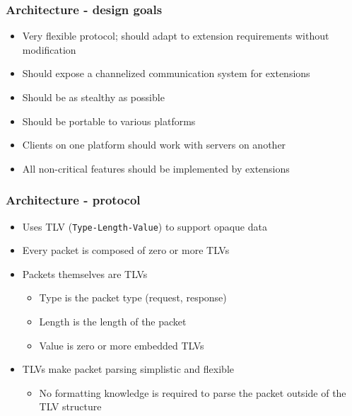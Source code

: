 \documentclass{beamer}
\newenvironment{sitemize}{\vspace{1mm}\begin{itemize}\itemsep 4pt\small}{\end{itemize}}
\begin{document}
\begin{frame}[t]
    \frametitle{Architecture - design goals}

    \begin{sitemize}
        \item Very flexible protocol; should adapt to extension
        requirements without modification

        \pause
        \item Should expose a channelized communication system for
        extensions

        \pause
        \item Should be as stealthy as possible

        \pause
        \item Should be portable to various platforms

        \pause
        \item Clients on one platform should work with servers on
        another

        \pause
        \item All non-critical features should be implemented by
        extensions
    \end{sitemize}
\end{frame}

\begin{frame}[t]
    \frametitle{Architecture - protocol}

    \begin{sitemize}
        \item Uses TLV (\texttt{Type-Length-Value}) to support
        opaque data

        \pause
        \item Every packet is composed of zero or more TLVs

        \pause
        \item Packets themselves are TLVs
        \begin{sitemize}
            \item Type is the packet type (request, response)
            \item Length is the length of the packet
            \item Value is zero or more embedded TLVs
        \end{sitemize}

        \pause
        \item TLVs make packet parsing simplistic and flexible
        \begin{sitemize}
            \item No formatting knowledge is required to parse the
            packet outside of the TLV structure
        \end{sitemize}
    \end{sitemize}
\end{frame}
\end{document}
